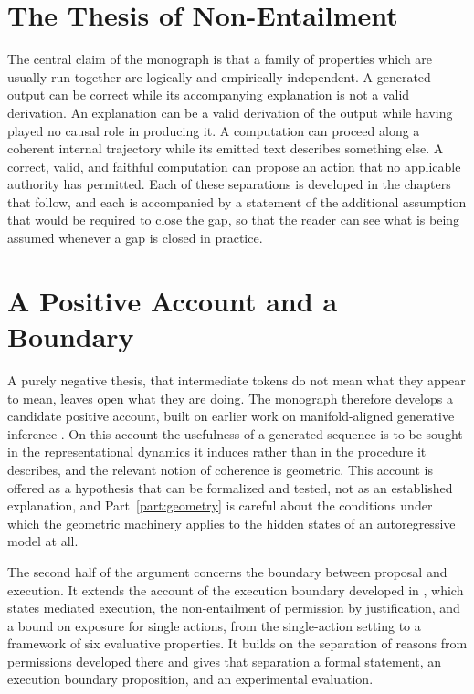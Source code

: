 \section{The Thesis of Non-Entailment}

The central claim of the monograph is that a family of properties which are usually run together are logically and empirically independent. A generated output can be correct while its accompanying explanation is not a valid derivation. An explanation can be a valid derivation of the output while having played no causal role in producing it. A computation can proceed along a coherent internal trajectory while its emitted text describes something else. A correct, valid, and faithful computation can propose an action that no applicable authority has permitted. Each of these separations is developed in the chapters that follow, and each is accompanied by a statement of the additional assumption that would be required to close the gap, so that the reader can see what is being assumed whenever a gap is closed in practice.

\section{A Positive Account and a Boundary}

A purely negative thesis, that intermediate tokens do not mean what they appear to mean, leaves open what they are doing. The monograph therefore develops a candidate positive account, built on earlier work on manifold-aligned generative inference \cite{flyxion2025,flyxion2025b}. On this account the usefulness of a generated sequence is to be sought in the representational dynamics it induces rather than in the procedure it describes, and the relevant notion of coherence is geometric. This account is offered as a hypothesis that can be formalized and tested, not as an established explanation, and Part~\ref{part:geometry} is careful about the conditions under which the geometric machinery applies to the hidden states of an autoregressive model at all.

The second half of the argument concerns the boundary between proposal and execution. It extends the account of the execution boundary developed in \cite{flyxion2026}, which states mediated execution, the non-entailment of permission by justification, and a bound on exposure for single actions, from the single-action setting to a framework of six evaluative properties. It builds on the separation of reasons from permissions developed there and gives that separation a formal statement, an execution boundary proposition, and an experimental evaluation.

